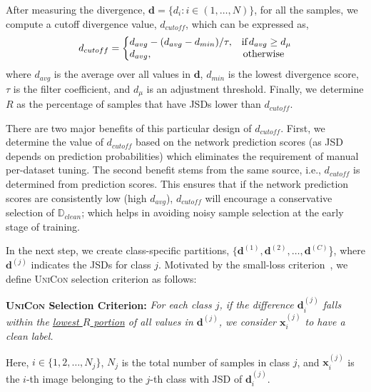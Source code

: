 \documentclass[10pt,twocolumn,letterpaper]{article}
\begin{document}
After measuring the divergence, $\mathbf{d} =\{d_i: i\in(1, \ldots, N) \}$, for all the samples, we compute a cutoff divergence value, $d_{cutoff}$, which can be expressed as,  
\begin{equation}\label{eq:filter_rate}
  d_{cutoff}  =\left\{
  \begin{array}{@{}ll@{}}
     d_{avg} - {(d_{avg}- d_{min})}/{\tau}, & \text{if} \hspace{0.05cm}  d_{avg} \geq d_{\mu} \\
    d_{avg}, & \hspace{0.05cm} \text{otherwise}
  \end{array}\right.
\end{equation}
where $d_{avg}$ is the average over all values in $\mathbf{d}$, $d_{min}$ is the lowest divergence score, $\tau$ is the filter coefficient, and $d_{\mu}$ is an adjustment threshold. Finally, we determine $R$ as the percentage of samples that have JSDs lower than $d_{cutoff}$.  

There are two major benefits of this particular design of $d_{cutoff}$. First, we determine the value of $d_{cutoff}$ based on the network prediction scores (as JSD depends on prediction probabilities) which eliminates the requirement of manual per-dataset tuning. The second benefit stems from the same source, i.e., $d_{cutoff}$ is determined from prediction scores. This ensures that if the network prediction scores are consistently low (high $d_{avg}$), $d_{cutoff}$ will encourage a conservative selection of $\mathbb{D}_{clean}$; which helps in avoiding noisy sample selection at the early stage of training. 




In the next step, we create class-specific partitions, $\{\mathbf{d}^{(1)},\mathbf{d}^{(2)}, \ldots,\mathbf{d}^{(C)}$\}, where $\mathbf{d}^{(j)}$ indicates the JSDs for class $j$. Motivated by the small-loss criterion~\cite{li2020dividemix}, we define \textsc{UniCon} selection criterion as follows:

\textbf{\textsc{UniCon} Selection Criterion:} 
{\it For each class $j$, if the difference $\mathbf{d}^{(j)}_i$ falls within the \underline{lowest $R$ portion} of all values in $\mathbf{d}^{(j)}$, we consider $\mathbf{x}^{(j)}_i$ to have a clean label.} 


\noindent Here, $i \in \{1,2, \dots, N_j\}$, $N_j$ is the total number of samples in class $j$, and $\mathbf{x}^{(j)}_i$ is the $i$-th image belonging to the $j$-th class with JSD of $\mathbf{d}^{(j)}_i$. 
\end{document}
